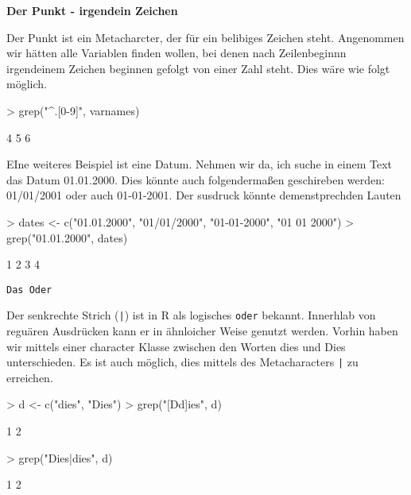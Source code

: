 \documentclass[a4paper]{report}
\newcommand{\R}{{\sffamily R}}
\begin{document}
\textbf{Der Punkt - irgendein Zeichen}

Der Punkt ist ein Metacharcter, der für ein belibiges Zeichen steht.
Angenommen wir hätten alle Variablen finden wollen, bei denen nach Zeilenbeginnn irgendeinem Zeichen beginnen gefolgt von einer Zahl steht. Dies wäre wie folgt möglich.

\begin{Schunk}
\begin{Sinput}
> grep("^.[0-9]", varnames)
\end{Sinput}
\begin{Soutput}
[1] 4 5 6
\end{Soutput}
\end{Schunk}

EIne weiteres Beispiel ist eine Datum. Nehmen wir da, ich suche in einem Text das Datum 01.01.2000. Dies könnte auch folgendermaßen geschireben werden: 01/01/2001 oder auch 01-01-2001. Der susdruck könnte demenstprechden Lauten

\begin{Schunk}
\begin{Sinput}
> dates <- c("01.01.2000", "01/01/2000", "01-01-2000", "01 01 2000")
> grep("01.01.2000", dates)
\end{Sinput}
\begin{Soutput}
[1] 1 2 3 4
\end{Soutput}
\end{Schunk}


\texttt{Das Oder}

Der senkrechte Strich (\verb!|!) ist in \R{} als logisches \texttt{oder} bekannt. Innerhlab von reguären Ausdrücken kann er in ähnloicher Weise genutzt werden. Vorhin haben wir mittels einer character Klasse zwischen den Worten dies und Dies unterschieden. Es ist auch möglich, dies mittels des Metacharacters \verb!|! zu erreichen.

\begin{Schunk}
\begin{Sinput}
> d <- c("dies", "Dies")
> grep("[Dd]ies", d)
\end{Sinput}
\begin{Soutput}
[1] 1 2
\end{Soutput}
\begin{Sinput}
> grep("Dies|dies", d)
\end{Sinput}
\begin{Soutput}
[1] 1 2
\end{Soutput}
\end{Schunk}
\end{document}
